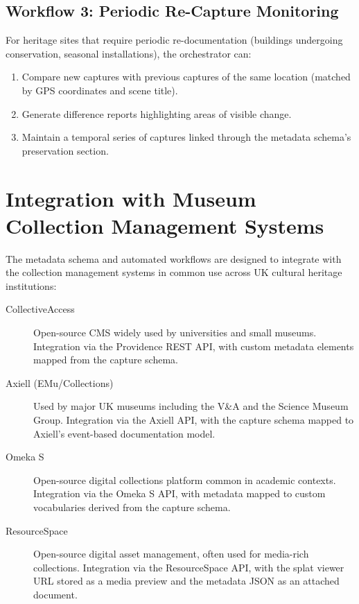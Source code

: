 \subsection{Workflow 3: Periodic Re-Capture Monitoring}

For heritage sites that require periodic re-documentation (buildings undergoing conservation, seasonal installations), the orchestrator can:

\begin{enumerate}
  \item Compare new captures with previous captures of the same location (matched by GPS coordinates and scene title).
  \item Generate difference reports highlighting areas of visible change.
  \item Maintain a temporal series of captures linked through the metadata schema's preservation section.
\end{enumerate}

\section{Integration with Museum Collection Management Systems}
\label{sec:meta-integration}

The metadata schema and automated workflows are designed to integrate with the collection management systems in common use across UK cultural heritage institutions:

\begin{description}
  \item[CollectiveAccess] Open-source CMS widely used by universities and small museums. Integration via the Providence REST API, with custom metadata elements mapped from the capture schema.

  \item[Axiell (EMu/Collections)] Used by major UK museums including the V\&A and the Science Museum Group. Integration via the Axiell API, with the capture schema mapped to Axiell's event-based documentation model.

  \item[Omeka S] Open-source digital collections platform common in academic contexts. Integration via the Omeka S API, with metadata mapped to custom vocabularies derived from the capture schema.

  \item[ResourceSpace] Open-source digital asset management, often used for media-rich collections. Integration via the ResourceSpace API, with the splat viewer URL stored as a media preview and the metadata JSON as an attached document.
\end{description}

